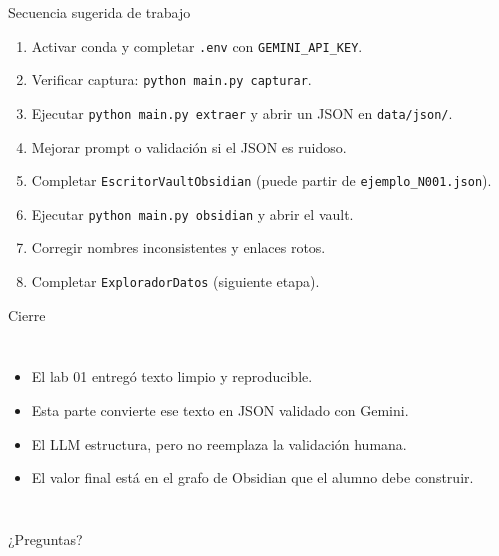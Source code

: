 \documentclass[11pt,aspectratio=169]{beamer}
\newcommand{\code}[1]{\texttt{#1}}
\begin{document}
\begin{frame}{Secuencia sugerida de trabajo}
\scriptsize
\begin{enumerate}[<+->]
\item Activar conda y completar \code{.env} con \code{GEMINI\_API\_KEY}.
\item Verificar captura: \code{python main.py capturar}.
\item Ejecutar \code{python main.py extraer} y abrir un JSON en \code{data/json/}.
\item Mejorar prompt o validación si el JSON es ruidoso.
\item Completar \code{EscritorVaultObsidian} (puede partir de \code{ejemplo\_N001.json}).
\item Ejecutar \code{python main.py obsidian} y abrir el vault.
\item Corregir nombres inconsistentes y enlaces rotos.
\item Completar \code{ExploradorDatos} (siguiente etapa).
\end{enumerate}
\end{frame}

\begin{frame}{Cierre}
\begin{columns}[T,onlytextwidth]
\small
\begin{itemize}[<+->]
\item El lab 01 entregó texto limpio y reproducible.
\item Esta parte convierte ese texto en JSON validado con Gemini.
\item El LLM estructura, pero no reemplaza la validación humana.
\item El valor final está en el grafo de Obsidian que el alumno debe construir.
\end{itemize}
\centering
{}
\end{columns}
\end{frame}

\begin{frame}
\centering
\Huge ¿Preguntas?
\end{frame}
\end{document}
